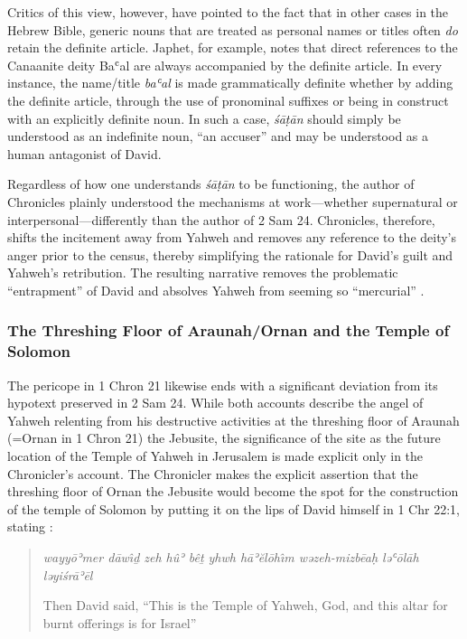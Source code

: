 Critics of this view, however, have pointed to the fact that in other
cases in the Hebrew Bible, generic nouns that are treated as personal
names or titles often \emph{do} retain the definite
article.\autocites[114--117]{japhet2009}[370--390]{japhet1993} Japhet,
for example, notes that direct references to the Canaanite deity Baʿal
are always accompanied by the definite article. In every instance, the
name/title \emph{baʿal} is made grammatically definite whether by adding
the definite article, through the use of pronominal suffixes or being in
construct with an explicitly definite
noun.\autocites[115]{japhet2009}[citing][§126d]{geseniuskautzsch1910} In
such a case, \emph{śāṭān} should simply be understood as an indefinite
noun, ``an accuser'' and may be understood as a human antagonist of
David.\autocites{stokes_jbl2009}[114--117]{japhet2009}[370--390]{japhet1993}

Regardless of how one understands \emph{śāṭān} to be functioning, the
author of Chronicles plainly understood the mechanisms at work---whether
supernatural or interpersonal---differently than the author of 2 Sam 24.
Chronicles, therefore, shifts the incitement away from Yahweh and
removes any reference to the deity's anger prior to the census, thereby
simplifying the rationale for David's guilt and Yahweh's retribution.
The resulting narrative removes the problematic ``entrapment'' of David
and absolves Yahweh from seeming so ``mercurial''
\autocite[4]{rollston_keith-stuckenbruck2016}.

\subsubsection{The Threshing Floor of Araunah/Ornan and the Temple of
Solomon}\label{the-threshing-floor-of-araunahornan-and-the-temple-of-solomon}

The pericope in 1 Chron 21 likewise ends with a significant deviation
from its hypotext preserved in 2 Sam 24. While both accounts describe
the angel of Yahweh relenting from his destructive activities at the
threshing floor of Araunah (=Ornan in 1 Chron 21) the Jebusite, the
significance of the site as the future location of the Temple of Yahweh
in Jerusalem is made explicit only in the Chronicler's account. The
Chronicler makes the explicit assertion that the threshing floor of
Ornan the Jebusite would become the spot for the construction of the
temple of Solomon by putting it on the lips of David himself in 1 Chr
22:1, stating :

\begin{quote}
\emph{wayyōʾmer dāwı̂ḏ zeh hûʾ bêṯ yhwh hāʾĕlōhı̂m wəzeh-mizbēaḥ ləʿōlāh
ləyiśrāʾēl}

Then David said, ``This is the Temple of Yahweh, God, and this altar for
burnt offerings is for Israel''
\end{quote}

